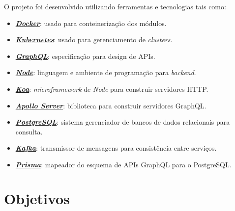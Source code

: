 \documentclass[10pt,twoside,a4paper]{article}
\begin{document}
    O projeto foi desenvolvido utilizando ferramentas e tecnologias tais como:
    
    \begin{itemize}
        \item \href{https://www.docker.com/}{\textbf{\textit{Docker}}}: usado para conteinerização dos módulos.
        \item \href{https://kubernetes.io/}{\textbf{\textit{Kubernetes}}}: usado para gerenciamento de \textit{clusters}.
        \item \href{https://graphql.org/}{\textbf{\textit{GraphQL}}}: especificação para design de APIs.
        \item \href{https://nodejs.org/en/}{\textbf{\textit{Node}}}: linguagem e ambiente de programação para \textit{backend}.
        \item \href{https://koajs.com/}{\textbf{\textit{Koa}}}: \textit{microframework} de \textit{Node} para construir servidores HTTP.
        \item \href{https://www.apollographql.com/server}{\textbf{\textit{Apollo Server}}}: biblioteca para construir servidores GraphQL.
        \item \href{https://www.postgresql.org/}{\textbf{\textit{PostgreSQL}}}: sistema gerenciador de bancos de dados relacionais para consulta.
        \item \href{https://kafka.apache.org/}{\textbf{\textit{Kafka}}}: transmissor de mensagens para consistência entre serviços.
        \item \href{https://prisma.io/}{\textbf{\textit{Prisma}}}: mapeador do esquema de APIs GraphQL para o PostgreSQL.
    \end{itemize}
    

\section{Objetivos}
\end{document}
